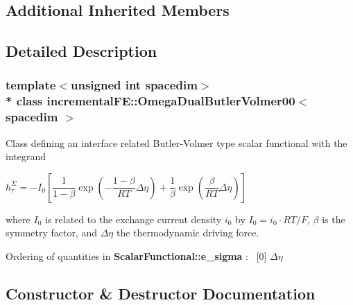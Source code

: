 \subsection*{Additional Inherited Members}


\subsection{Detailed Description}
\subsubsection*{template$<$unsigned int spacedim$>$\\*
class incremental\+F\+E\+::\+Omega\+Dual\+Butler\+Volmer00$<$ spacedim $>$}

Class defining an interface related Butler-\/\+Volmer type scalar functional with the integrand

$ h^\Sigma_\tau = -I_0\left[ \dfrac{1}{1-\beta} \exp\left( - \dfrac{1-\beta}{RT} \Delta \eta \right) + \dfrac{1}{\beta} \exp\left( \dfrac{\beta}{RT} \Delta \eta \right) \right] $

where $I_0$ is related to the exchange current density $i_0$ by $I_0 = i_0 \cdot RT / F $, $\beta$ is the symmetry factor, and $\Delta \eta$ the thermodynamic driving force.

Ordering of quantities in {\bf Scalar\+Functional\+::e\+\_\+sigma} \+:~\newline
\mbox{[}0\mbox{]} $\Delta \eta$ 

\subsection{Constructor \& Destructor Documentation}
